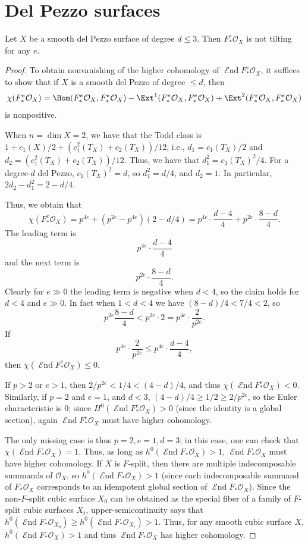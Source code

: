 \documentclass{article}
\def\O{\mathcal O}
\numberwithin{equation}{section}
\theoremstyle{theorem}
\numberwithin{thm}{section}
\theoremstyle{definition}
\DeclareMathOperator{\SEnd}{\mathcal{E}nd}
\begin{document}
\section{Del Pezzo surfaces}
\label{2fold}

\begin{thm}
\label{main1}
Let $X$ be a smooth del Pezzo surface of degree $d\leq 3$. Then $F_*^e\O_X$ is not tilting for any $e$.
\end{thm}

\begin{proof}
To obtain nonvanishing of the higher cohomology of $\SEnd F_*^e \O_X$,
it suffices to show that if $X$ is a smooth del Pezzo of degree $\leq d$, then  
$$\chi(F_*^e\O_X)=
\Hom(F_*^e\O_X,F_*^e\O_X)
-\Ext^1(F_*^e\O_X,F_*^e\O_X)
+\Ext^2(F_*^e\O_X,F_*^e\O_X)
$$
 is nonpositive.

When $n=\dim X=2$, we have that the Todd class is $1+c_1(X)/2+(c_1^2(T_X)+c_2(T_X))/12$, i.e., $d_1=c_1(T_X)/2$ and $d_2=(c_1^2(T_X)+c_2(T_X))/12$.
Thus, we have that $d_1^2 = c_1(T_X)^2/4$.
For a degree-$d$ del Pezzo, $c_1(T_X)^2=d$, so $d_1^2 =d/4$, and $d_2=1$. 
In particular, $2d_2-d_1^2=2-d/4$.

Thus, we obtain that 
$$
\chi(F_*^e\O_X) = p^{4e}+(p^{2e}-p^{4e})(2-d/4)
=
p^{4e}\cdot \frac{d-4}{4}
+
p^{2e}\cdot \frac{8-d}{4}.
$$
The leading term is 
$$
p^{4e}\cdot \frac{d-4}{4}
$$
and the next term is 
$$
p^{2e}\cdot \frac{8-d}{4}.
$$
Clearly for $e\gg0$ the leading term is negative when $d<4$, so the claim holds for $d<4$ and $e\gg0$. 
In fact when $1<d<4$ we have $(8-d)/4 <7/4< 2$, so 
$$
p^{2e}\frac{8-d}{4} < p^{2e}\cdot 2 = p^{4e}\cdot \frac{2}{p^{2e}}.
$$
If 
$$
p^{4e}\cdot \frac{2}{p^{2e}} \leq 
p^{4e}\cdot \frac{d-4}{4},
$$
then $\chi(\SEnd F_*^e\O_X)\leq 0$.

If $p>2$ or $e>1$, then $2/p^{2e}<1/4<(4-d)/4$, and thus $\chi(\SEnd F_*^e\O_X)<0$. 
Similarly,
if $p=2$ and $e=1$,  and $d<3$, $(4-d)/4\geq 1/2\geq 2/p^{2e}$, so the Euler characteristic is 0; since $H^0(\SEnd F_*^e\O_X)>0$ (since the identity is a global section), again $\SEnd F_*^e\O_X$ must have higher cohomology.

The only missing case is thus $p=2, e=1,d=3$; 
in this case, one can check that $\chi(\SEnd F_*\O_X)=1$. Thus, as long as $h^0(\SEnd F_* \O_X)>1$, $\SEnd F_*\O_X$ must have higher cohomology. If $X$ is $F$-split, then there are multiple indecomposable summands of $\O_X$, so $h^0(\SEnd F_*\O_X)>1$ (since each indecomposable summand of $F_*\O_X$ corresponds to an idempotent global section of $\SEnd F_*\O_X$). Since the non-$F$-split cubic surface $X_0$ can be obtained as the special fiber of a family of $F$-split cubic surfaces $X_t$, upper-semicontinuity says that 
$h^0(\SEnd F_* \O_{X_0})\geq 
h^0(\SEnd F_* \O_{X_t}) >1$. Thus, for any smooth cubic surface $X$, $h^0(\SEnd F_*\O_X)>1$ and thus $\SEnd F_*\O_X$ has higher cohomology.
\end{proof}
\end{document}
